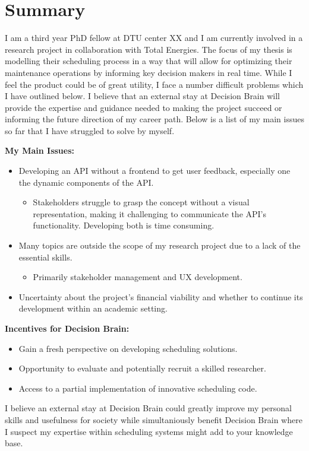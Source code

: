 \section{Summary}
I am a third year PhD fellow at DTU center XX and I am currently involved in a research project in collaboration with Total Energies. The focus of my thesis is modelling 
their scheduling process in a way that will allow for optimizing their maintenance operations by informing key decision makers in real time. While I feel
the product could be of great utility, I face a number difficult problems which I have outlined below. I believe that an external stay at Decision Brain will provide the 
expertise and guidance needed to making the project succeed or informing the future direction of my career path. 
Below is a list of my main issues so far that I have struggled to solve by myself. 

\textbf{My Main Issues:}
\begin{itemize}
	\item Developing an API without a frontend to get user feedback, especially one the dynamic components of the API.
	\begin{itemize}
		\item Stakeholders struggle to grasp the concept without a visual representation, making it challenging to communicate the API's functionality. Developing both is time consuming.
	\end{itemize}
	\item Many topics are outside the scope of my research project due to a lack of the essential skills. 
	\begin{itemize}
		\item Primarily stakeholder management and UX development.
	\end{itemize}
	\item Uncertainty about the project's financial viability and whether to continue its development within an academic setting.
\end{itemize}

\textbf{Incentives for Decision Brain:} 
\begin{itemize} 
	\item Gain a fresh perspective on developing scheduling solutions. 
	\item Opportunity to evaluate and potentially recruit a skilled researcher. 
	\item Access to a partial implementation of innovative scheduling code.
\end{itemize}

I believe an external stay at Decision Brain could greatly improve my personal skills and usefulness for society
while simultaniously benefit Decision Brain where I suspect my expertise within scheduling systems might add to your knowledge base.
